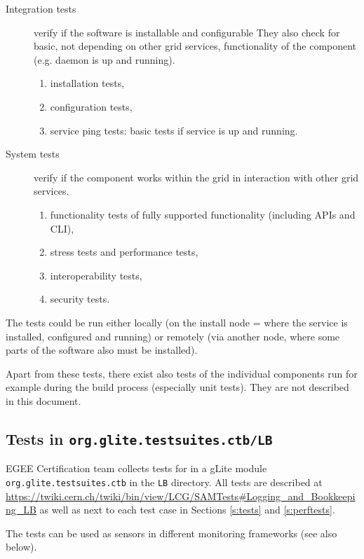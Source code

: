 \begin{description} 
\item[Integration tests] verify if the software is installable and configurable
They also check for basic, not depending on other grid services, functionality
of the component (e.g. daemon is up and running).
\begin{enumerate}
\item installation tests,
\item configuration tests,
\item service ping tests: basic tests if service is up and running.
\end{enumerate}
%
\item[System tests] verify if the component works within the grid in
interaction with other grid services.
\begin{enumerate}
\item functionality tests of fully supported functionality (including APIs and CLI), 	
\item stress tests and performance tests,
\item interoperability tests,
\item security tests.
\end{enumerate}
\end{description}

The tests could be run either locally (on the install node = where the service
is installed, configured and running) or remotely (via another node, where some
parts of the software also must be installed).

Apart from these tests, there exist also tests of the individual components run
for example during the build process (especially unit tests). They are not
described in this document.


\subsection{Tests in \texttt{org.glite.testsuites.ctb/LB}}

EGEE Certification team collects tests for \LB in a gLite module
\verb'org.glite.testsuites.ctb' in the \verb'LB' directory. All \LB tests are
described at
\url{https://twiki.cern.ch/twiki/bin/view/LCG/SAMTests#Logging_and_Bookkeeping_LB}
as well as next to each test case in Sections \ref{s:tests} and \ref{s:perftests}.

The tests can be used as sensors in different monitoring frameworks 
(see also below).




